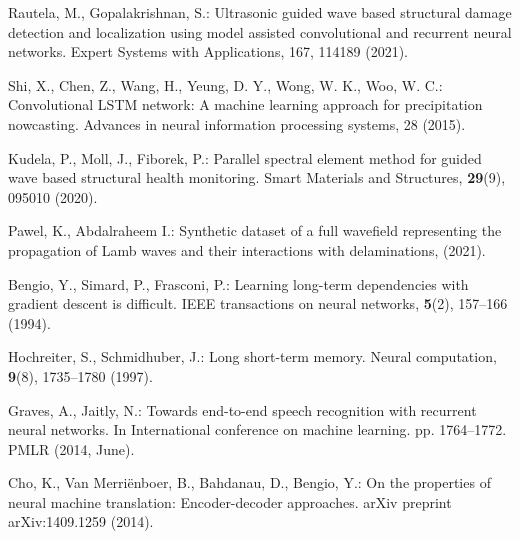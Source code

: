 \documentclass{IOS-Book-Article}
\begin{document}
\begin{thebibliography}{8}
	Rautela, M., Gopalakrishnan, S.: Ultrasonic guided wave based structural damage 
	detection and localization using model assisted convolutional and recurrent 
	neural networks. Expert Systems with Applications, 167, 114189 (2021).
	
	Shi, X., Chen, Z., Wang, H., Yeung, D. Y., Wong, W. K., Woo, W. C.: 
	Convolutional LSTM network: A machine learning approach for precipitation 
	nowcasting. Advances in neural information processing systems, 28 (2015).
	
	Kudela, P., Moll, J., Fiborek, P.: Parallel spectral element method for guided 
	wave based structural health monitoring. Smart Materials and Structures, 
	\textbf{29}(9), 095010 (2020).
	
	Pawel, K., Abdalraheem I.: Synthetic dataset of a full wavefield
	representing the propagation of Lamb waves and their interactions with
	delaminations, (2021).
	
	Bengio, Y., Simard, P., Frasconi, P.: Learning long-term dependencies with 
	gradient descent is difficult. IEEE transactions on neural networks, 
	\textbf{5}(2), 157--166 (1994).
	
	Hochreiter, S., Schmidhuber, J.: Long short-term memory. Neural computation, 
	\textbf{9}(8), 1735--1780 (1997).
	
	Graves, A., Jaitly, N.: Towards end-to-end speech recognition with recurrent 
	neural networks. In International conference on machine learning. pp. 
	1764--1772. PMLR (2014, June).
	
	Cho, K., Van Merriënboer, B., Bahdanau, D., Bengio, Y.: On the properties of 
	neural machine translation: Encoder-decoder approaches. arXiv preprint 
	arXiv:1409.1259  (2014).
	
\end{thebibliography}
\end{document}

